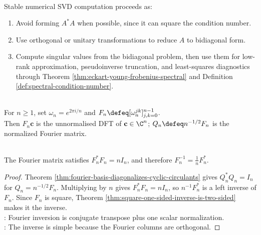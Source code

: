 \begin{method} \label{meth:svd-numerics-preview} \\
Stable numerical SVD computation proceeds as:
\begin{enumerate}[label=(\roman*)]
\setlength{\itemsep}{0pt}
\item Avoid forming $A^*A$ when possible, since it can square the condition number.
\item Use orthogonal or unitary transformations to reduce $A$ to bidiagonal form.
\item Compute singular values from the bidiagonal problem, then use them for low-rank approximation, pseudoinverse truncation, and least-squares diagnostics through Theorem \ref{thm:eckart-young-frobenius-spectral} and Definition \ref{def:spectral-condition-number}.
\end{enumerate}
\end{method}

\begin{definition} \label{def:discrete-fourier-matrix} \\
For $n\geq1$, set $\omega_n=e^{2\pi i/n}$ and $F_n\defeq[\omega_n^{jk}]_{j,k=0}^{n-1}$.\\
Then $F_n\mathbf{c}$ is the unnormalised DFT of $\mathbf{c}\in\C^n$; $Q_n\defeq n^{-1/2}F_n$ is the normalized Fourier matrix.
\end{definition}

\begin{proposition} \label{prop:fourier-matrix-inverse} \\
The Fourier matrix satisfies $F_n^*F_n=nI_n$, and therefore $F_n^{-1}=\frac1nF_n^*$.
\begin{proof}
Theorem \ref{thm:fourier-basis-diagonalizes-cyclic-circulants} gives $Q_n^*Q_n=I_n$ for $Q_n=n^{-1/2}F_n$. Multiplying by $n$ gives $F_n^*F_n=nI_n$, so $n^{-1}F_n^*$ is a left inverse of $F_n$. Since $F_n$ is square, Theorem \ref{thm:square-one-sided-inverse-is-two-sided} makes it the inverse.\\
: Fourier inversion is conjugate transpose plus one scalar normalization.\\
: The inverse is simple because the Fourier columns are orthogonal.
\end{proof}
\end{proposition}

